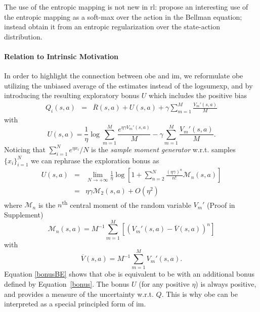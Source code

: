The use of the entropic mapping is not new in \gls{rl}: \cite{pmlr-v70-asadi17a} propose an interesting use of the entropic mapping as a soft-max over the action in the Bellman equation; \cite{peters2010relative} instead obtain it from an entropic regularization over the state-action distribution.

\paragraph{Relation to Intrinsic Motivation}
In order to highlight the connection between \gls{obe} and \gls{im}, we reformulate \gls{obe} utilizing the unbiased average of the estimates instead of the logsumexp, and by introducing the resulting exploratory bonus $U$ which includes the positive bias
\begin{eqnarray}
Q_i(s,a)\! &=&\! \overline{R}(s,a) + U(s,a) +  \gamma  \sum_{m=1}^M \frac{V_m'(s,a)}{M} \label{bonusBE}
\end{eqnarray}
with
\begin{equation}
U(s,a) \! =\!  \frac{1}{\eta}\log\sum_{m=1}^M \frac{e^{\eta\gamma V_m'(s,a)}}{M} - \gamma  \sum_{m=1}^M \frac{V_m'(s,a)}{M}. \label{bonusdef}
\end{equation}
Noticing that $\sum_{i=1}^N e^{\eta x_i}/N$ is the \textit{sample moment generator} w.r.t. samples $\{x_i\}_{i=1}^N$ we can rephrase the exploration bonus as
\begin{eqnarray}
U(s,a)& = & \lim_{N \to +\infty}\frac{1}{\eta} \log [  1 + \sum_{n=2}^{N} \frac{(\eta\gamma)^n}{n!}\mathcal{M}_n(s,a)] \nonumber \\
& = & \eta \gamma \mathcal{M}_2(s,a)  + O(\eta^2)\label{bonus}
\end{eqnarray}
where $\mathcal{M}_n$ is the $n$\textsuperscript{th} central moment of the random variable $V_m'$ (Proof in Supplement)
\begin{equation}
\mathcal{M}_n(s,a) = M^{-1} \sum_{m=1}^M [( V_m'(s,a) -\overline{V}(s,a))^n]\nonumber
\end{equation}
with 
\begin{equation}
\overline{V}(s,a) = M^{-1} \sum_{m=1}^M V_m'(s,a).\nonumber
\end{equation}
Equation \eqref{bonusBE} shows that \gls{obe} is equivalent to \gls{be} with an additional bonus defined by Equation~\ref{bonus}. The bonus $U$ (for any positive $\eta$) is always positive, and provides a measure of the uncertainty w.r.t. $Q$. This is why \gls{obe} can be interpreted as a special principled form of \gls{im}.

